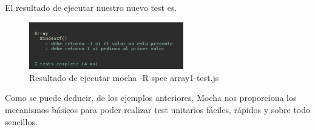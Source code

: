 

El resultado de ejecutar nuestro nuevo test es.

\begin{figure}[htbp]
\centering
\includegraphics[width=0.6\textwidth]{imagenes/mochaejecucion1}
\caption{Resultado de ejecutar mocha -R spec array1-test.js}
\label{fig:mochaejecucion1}
\end{figure}

Como se puede deducir, de los ejemplos anteriores, Mocha nos proporciona los mecanismos básicos para poder realizar test unitarios fáciles, rápidos y sobre todo sencillos.

